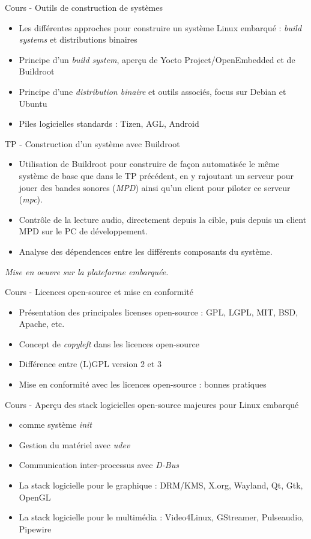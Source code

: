 \documentclass[a4paper,12pt,obeyspaces,spaces,hyphens]{article}
\begin{document}
\feagendatwocolumn
{Cours - Outils de construction de systèmes}
{
  \begin{itemize}
  \item Les différentes approches pour construire un système Linux
    embarqué : {\em build systems} et distributions binaires
  \item Principe d'un {\em build system}, aperçu de Yocto
    Project/OpenEmbedded et de Buildroot
  \item Principe d'une {\em distribution binaire} et outils associés,
    focus sur Debian et Ubuntu
  \item Piles logicielles standards : Tizen, AGL, Android
  \end{itemize}
}
{TP - Construction d'un système avec Buildroot}
{
  \begin{itemize}
  \item Utilisation de Buildroot pour construire de façon automatisée
    le même système de base que dans le TP précédent, en y rajoutant
    un serveur pour jouer des bandes sonores ({\em MPD}) ainsi
    qu'un client pour piloter ce serveur ({\em mpc}).
  \item Contrôle de la lecture audio, directement depuis la
    cible, puis depuis un client MPD sur le PC de développement.
  \item Analyse des dépendences entre les différents composants
    du système.
  \end{itemize}

  \vspace{0.5cm}
  {\em Mise en oeuvre sur la plateforme embarquée.}
}

\feagendaonecolumn
{Cours - Licences open-source et mise en conformité}
{
  \begin{itemize}
  \item Présentation des principales licenses open-source : GPL, LGPL,
    MIT, BSD, Apache, etc.
  \item Concept de {\em copyleft} dans les licences open-source
  \item Différence entre (L)GPL version 2 et 3
  \item Mise en conformité avec les licences open-source : bonnes
    pratiques
  \end{itemize}
}

\feagendaonecolumn
{Cours - Aperçu des stack logicielles open-source majeures pour Linux embarqué}
{
  \begin{itemize}
  \item {} comme système {\em init}
  \item Gestion du matériel avec {\em udev}
  \item Communication inter-processus avec {\em D-Bus}
  \item La stack logicielle pour le graphique : DRM/KMS, X.org,
    Wayland, Qt, Gtk, OpenGL
  \item La stack logicielle pour le multimédia : Video4Linux,
    GStreamer, Pulseaudio, Pipewire
  \end{itemize}
}
\end{document}
